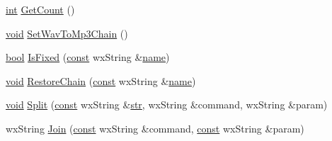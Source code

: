 \begin{DoxyCompactItemize}
\hyperlink{xmltok_8h_a5a0d4a5641ce434f1d23533f2b2e6653}{int} \hyperlink{class_batch_commands_ac3f57340c9f50d933d6a31d035aed503}{Get\+Count} ()
\item 
\hyperlink{sound_8c_ae35f5844602719cf66324f4de2a658b3}{void} \hyperlink{class_batch_commands_a930b1e26673644bc0b633b5aa1288438}{Set\+Wav\+To\+Mp3\+Chain} ()
\item 
\hyperlink{mac_2config_2i386_2lib-src_2libsoxr_2soxr-config_8h_abb452686968e48b67397da5f97445f5b}{bool} \hyperlink{class_batch_commands_a9deac3cd1e20276bee8f318853f7b62a}{Is\+Fixed} (\hyperlink{getopt1_8c_a2c212835823e3c54a8ab6d95c652660e}{const} wx\+String \&\hyperlink{lib_2expat_8h_a1b49b495b59f9e73205b69ad1a2965b0}{name})
\item 
\hyperlink{sound_8c_ae35f5844602719cf66324f4de2a658b3}{void} \hyperlink{class_batch_commands_a3ffdf1db018b0c8756b872aaf4dd9535}{Restore\+Chain} (\hyperlink{getopt1_8c_a2c212835823e3c54a8ab6d95c652660e}{const} wx\+String \&\hyperlink{lib_2expat_8h_a1b49b495b59f9e73205b69ad1a2965b0}{name})
\item 
\hyperlink{sound_8c_ae35f5844602719cf66324f4de2a658b3}{void} \hyperlink{class_batch_commands_a0c0bbdd039d28b90f260a6b7061ce879}{Split} (\hyperlink{getopt1_8c_a2c212835823e3c54a8ab6d95c652660e}{const} wx\+String \&\hyperlink{sndfile__save_8m_a4b99ff73a8a869319570237b5c57ab03}{str}, wx\+String \&command, wx\+String \&param)
\item 
wx\+String \hyperlink{class_batch_commands_ab6b1a17957726bf32d925efbdf0f8a66}{Join} (\hyperlink{getopt1_8c_a2c212835823e3c54a8ab6d95c652660e}{const} wx\+String \&command, \hyperlink{getopt1_8c_a2c212835823e3c54a8ab6d95c652660e}{const} wx\+String \&param)
\end{DoxyCompactItemize}
